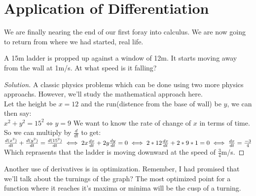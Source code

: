 \section{Application of Differentiation}
We are finally nearing the end of our first foray into calculus. We are now going to return from where we had started, real life.\\
\begin{example}
    A 15m ladder is propped up against a window of 12m. It starts moving away from the wall at 1m/s. At what speed is it falling?
\end{example}
\begin{proof}
    [Solution]
    A classic physics problems which can be done using two more physics approachs. However, we'll study the mathematical approach here.\\
    Let the height be $x=12$ and the run(distence from the base of wall) be $y$, we can then say:\\
    $x^2+y^2=15^2 \iff y=9$
    We want to know the rate of change of $x$ in terms of time. So we can multiply by $\frac{d}{dt}$ to get:\\
    $\frac{d(x^2)}{dt}+\frac{d(y^2)}{dt}=\frac{d(15^2)}{dt}\\
    \iff 2x\frac{dx}{dt}+2y\frac{dy}{dt}=0\\
    \iff 2*12\frac{dx}{dt}+2*9*1=0\\
    \iff \frac{dx}{dt}=\frac{-3}{4}$\\
    Which reprasents that the ladder is moving downward at the speed of $\frac{3}{4}$m/s.
\end{proof}
Another use of derivatives is in optimization. Remember, I had promised that we'll talk about the turnings of the graph? The most optimized point for a function where it reaches it's maxima or minima will be the cusp of a turning.
